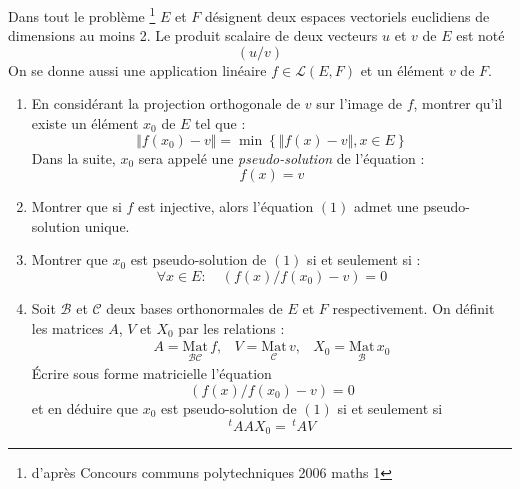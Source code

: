 Dans tout le problème \footnote{d'après Concours communs polytechniques 2006 maths 1} $E$ et $F$ désignent deux espaces vectoriels euclidiens de dimensions au moins 2. Le produit scalaire de deux vecteurs $u$ et $v$ de $E$ est noté
\begin{displaymath}
 (u/v)
\end{displaymath}
On se donne aussi une application linéaire $f\in\mathcal{L}(E,F)$ et un élément $v$ de $F$.
\begin{enumerate}
 \item En considérant la projection orthogonale de $v$ sur l'image de $f$, montrer qu'il existe un élément $x_0$ de $E$ tel que :
\begin{displaymath}
  \Vert f(x_0) -v\Vert = \min \left\lbrace \Vert f(x) -v\Vert, x\in E \right\rbrace 
\end{displaymath}
Dans la suite, $x_0$ sera appelé une \emph{pseudo-solution} de l'équation :
\begin{equation}
  f(x)=v
\end{equation} 

\item Montrer que si $f$ est injective, alors l'équation $(1)$ admet une pseudo-solution unique.

\item Montrer que $x_0$ est pseudo-solution de $(1)$ si et seulement si :
\begin{displaymath}
 \forall x \in E : \quad (f(x)/f(x_0)-v)=0
\end{displaymath}

\item Soit $\mathcal{B}$ et $\mathcal{C}$ deux bases orthonormales de $E$ et $F$ respectivement. On définit les matrices $A$, $V$ et $X_0$ par les relations :
\begin{displaymath}
 \begin{array}{ccc}
A=\underset{\mathcal{B}\mathcal{C}}{\mathrm{Mat}}\, f ,&
V=\underset{\mathcal{C}}{\mathrm{Mat}}\, v ,&
X_0=\underset{\mathcal{B}}{\mathrm{Mat}}\, x_0 
\end{array}
\end{displaymath}
\'Ecrire sous forme matricielle l'équation
\begin{displaymath}
 (f(x)/f(x_0)-v)=0
\end{displaymath}
et en déduire que $x_0$ est pseudo-solution de $(1)$ si et seulement si
\begin{displaymath}
 ^tAAX_0 = \,^tAV
\end{displaymath}


\end{enumerate}
